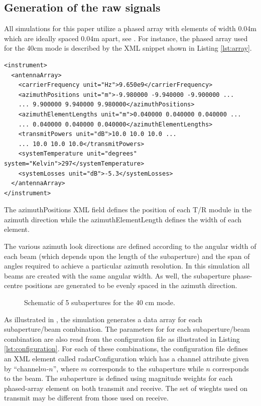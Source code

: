 \subsection{Generation of the raw signals}
All simulations for this paper utilize a phased array with elements of width 0.04m which are ideally spaced 0.04m apart, see . For instance, the phased array used for the 40cm mode is described by the XML snippet shown in Listing \ref{lst:array}.
\lstset{language=XML}
\begin{lstlisting}[caption={Phased Array configuration}, label={lst:array}]
<instrument>
  <antennaArray>
    <carrierFrequency unit="Hz">9.650e9</carrierFrequency>
    <azimuthPositions unit="m">-9.980000 -9.940000 -9.900000 ...
    ... 9.900000 9.940000 9.980000</azimuthPositions>
    <azimuthElementLengths unit="m">0.040000 0.040000 0.040000 ...
    ... 0.040000 0.040000 0.040000</azimuthElementLengths>
    <transmitPowers unit="dB">10.0 10.0 10.0 ...
    ... 10.0 10.0 10.0</transmitPowers>
    <systemTemperature unit="degrees" system="Kelvin">297</systemTemperature>
    <systemLosses unit="dB">-5.3</systemLosses>
  </antennaArray>
</instrument>
\end{lstlisting}
The azimuthPositions XML field defines the position of each T/R module in the azimuth direction while the azimuthElementLength defines the width of each element.
\par
The various azimuth look directions are defined according to the angular width of each beam (which depends upon the length of the subaperture) and the span of angles required to achieve a particular azimuth resolution. In this simulation all beams are created with the same angular width. As well, the subaperture phase-centre positions are generated to be evenly spaced in the azimuth direction.
\begin{figure}[h!]
\begin{center}
 \resizebox{0.7\columnwidth}{!}{}
 \caption{Schematic of 5 subapertures for the 40 cm mode.}
 \label{fg:fivechansubaperture}
 \end{center}
\end{figure}
\par
As illustrated in , the simulation generates a data array for each subaperture/beam combination. The parameters for for each subaperture/beam combination are also read from the configuration file as illustrated in Listing \ref{lst:configuration}. For each of these combinations, the configuration file defines an XML element called radarConfiguration which has a channel attribute given by ``channel$m$-$n$'', where $m$ corresponds to the subaperture while $n$ corresponds to the beam. The subaperture is defined using magnitude weights for each phased-array element on both transmit and receive. The set of wieghts used on transmit may be different from those used on receive. 
